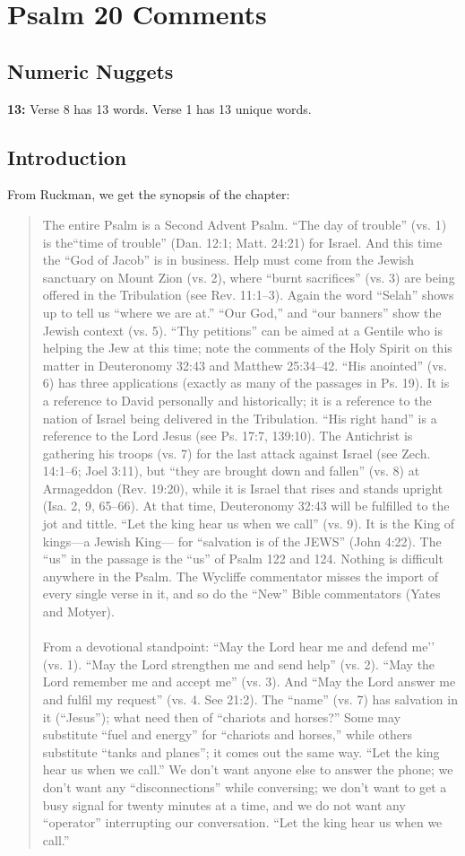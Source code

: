 \section{Psalm 20 Comments}

\subsection{Numeric Nuggets}
\textbf{13:} Verse 8 has 13 words. Verse 1 has 13 unique words.


\subsection{Introduction}


From Ruckman, we get the synopsis of the chapter:
\begin{quote}
The entire Psalm is a Second Advent Psalm. “The day of trouble” (vs. 1) is the“time of trouble” (Dan. 12:1; Matt. 24:21) for Israel. And this time the “God of Jacob” is in business. Help must come from the Jewish sanctuary on Mount Zion (vs. 2), where “burnt sacrifices” (vs. 3) are being offered in the Tribulation (see Rev. 11:1–3). Again the word “Selah” shows up to tell us “where we are at.” “Our God,” and “our banners” show the Jewish context (vs. 5). “Thy petitions” can be aimed at a Gentile who is helping the Jew at this time; note the comments of the Holy Spirit on this matter in Deuteronomy 32:43 and Matthew 25:34–42. “His anointed” (vs. 6) has three applications (exactly  as many of the passages in Ps. 19). It is a reference to David personally and historically; it is a reference to the nation of Israel being delivered in the Tribulation. “His right hand” is a reference to the Lord Jesus (see Ps. 17:7, 139:10). The Antichrist is gathering his troops (vs. 7) for the last attack against Israel (see Zech. 14:1–6; Joel 3:11), but “they are brought down and fallen” (vs. 8) at Armageddon (Rev. 19:20), while it is Israel that rises and stands upright (Isa. 2, 9, 65–66). At that time, Deuteronomy 32:43 will be fulfilled to the jot and tittle. “Let the king hear us when we call” (vs. 9). It is the King of kings—a Jewish King— for “salvation is of the JEWS” (John 4:22). The “us” in the passage is the “us” of Psalm 122 and 124. Nothing is difficult anywhere in the Psalm. The Wycliffe commentator misses the import of every single verse in it, and so do the “New” Bible commentators (Yates and Motyer). \cite{Ruckman1992PsalmsV1}\\
\\
From a devotional standpoint: “May the Lord hear me and defend me’’ (vs. 1). “May the Lord strengthen me and send help”  (vs. 2). “May the Lord remember me and accept me” (vs. 3). And “May the Lord answer me and fulfil my request” (vs. 4. See 21:2). The “name” (vs. 7) has salvation in it (“Jesus”); what need then of “chariots and horses?” Some may substitute “fuel and energy” for “chariots and horses,” while others substitute “tanks and planes”; it comes out the same way. “Let the king hear us when we call.” We don’t want anyone else to answer the phone; we don’t want any “disconnections” while conversing; we don’t want to get a busy signal for twenty minutes at a time, and we do not want any “operator” interrupting our conversation. “Let the king hear us when we call.”
\end{quote}
